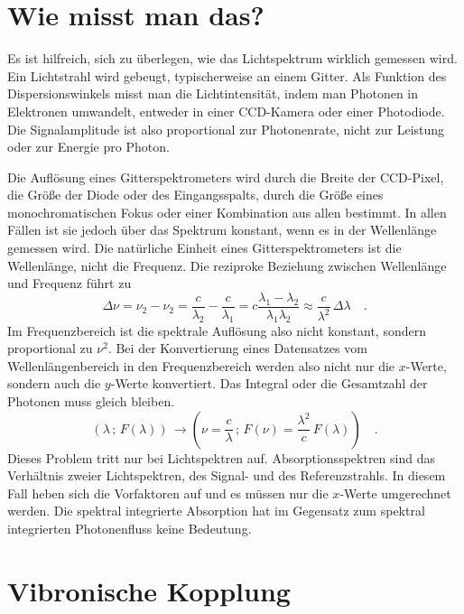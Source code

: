 \section{Wie misst man das?}


Es ist hilfreich, sich zu überlegen, wie das Lichtspektrum wirklich gemessen wird. Ein Lichtstrahl wird gebeugt, typischerweise an einem Gitter. Als Funktion des Dispersionswinkels misst man die Lichtintensität, indem man Photonen in Elektronen umwandelt, entweder in einer CCD-Kamera oder einer Photodiode. Die Signalamplitude ist also proportional zur Photonenrate, nicht zur Leistung oder zur Energie pro Photon.

Die Auflösung eines Gitterspektrometers wird durch die Breite der CCD-Pixel, die Größe der Diode oder des Eingangsspalts, durch die Größe eines monochromatischen Fokus oder einer Kombination aus allen bestimmt. In allen Fällen ist sie jedoch über das Spektrum konstant, wenn es in der Wellenlänge gemessen wird. Die natürliche Einheit eines Gitterspektrometers ist die Wellenlänge, nicht die Frequenz. Die reziproke Beziehung zwischen Wellenlänge und Frequenz führt zu 
\begin{equation}
 \Delta \nu = \nu_2 - \nu_2 = \frac{c}{\lambda_2} - \frac{c}{\lambda_1}  = c \frac{\lambda_1 - \lambda_2}{\lambda_1 \lambda_2} \approx \frac{c}{\lambda^2} \, \Delta \lambda \quad .
\end{equation}
Im Frequenzbereich ist die spektrale Auflösung also nicht konstant, sondern proportional zu $\nu^2$. Bei der Konvertierung eines Datensatzes vom Wellenlängenbereich in den Frequenzbereich werden also nicht nur die $x$-Werte, sondern auch die $y$-Werte konvertiert. Das Integral oder die Gesamtzahl der Photonen muss gleich bleiben.
\begin{equation}
 \left( \lambda \, ; \, F(\lambda) \right) \, \rightarrow  \left( \nu = \frac{c}{ \lambda} \, ; \,  F(\nu) = \frac{\lambda^2}{ c } \, F(\lambda) \right)  \quad .
\end{equation}
Dieses Problem tritt nur bei Lichtspektren auf. Absorptionsspektren sind das Verhältnis zweier Lichtspektren, des Signal- und des Referenzstrahls. In diesem Fall heben sich die Vorfaktoren auf und es müssen nur die $x$-Werte umgerechnet werden. Die spektral integrierte Absorption hat im Gegensatz zum spektral integrierten Photonenfluss keine Bedeutung.



\section{Vibronische Kopplung}

